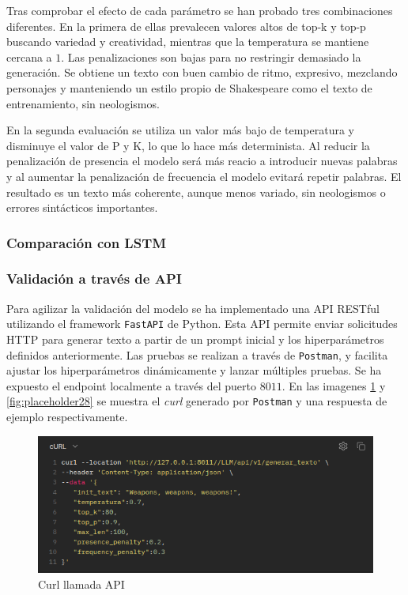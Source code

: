 \documentclass[11pt]{book}
\begin{document}
Tras comprobar el efecto de cada parámetro se han probado tres combinaciones diferentes. 
En la primera de ellas prevalecen valores altos de top-k y top-p buscando variedad y creatividad, mientras que la temperatura se mantiene cercana a $1$. Las penalizaciones son bajas para no restringir demasiado la generación. Se obtiene un texto con buen cambio de ritmo, expresivo, mezclando personajes y manteniendo un estilo propio de Shakespeare como el texto de entrenamiento, sin neologismos. 

En la segunda evaluación se utiliza un valor más bajo de temperatura y disminuye el valor de P y K, lo que lo hace más determinista. Al reducir la penalización de presencia el modelo será más reacio a introducir nuevas palabras y al aumentar la penalización de frecuencia el modelo evitará repetir palabras. El resultado es un texto más coherente, aunque menos variado, sin neologismos o errores sintácticos importantes.



\subsubsection{Comparación con LSTM}


\subsubsection{Validación a través de API}

Para agilizar la validación del modelo se ha implementado una API RESTful utilizando el framework \texttt{FastAPI} de Python. Esta API permite enviar solicitudes HTTP para generar texto a partir de un prompt inicial y los hiperparámetros definidos anteriormente. Las pruebas se realizan a través de \texttt{Postman}, y facilita ajustar los hiperparámetros dinámicamente y lanzar múltiples pruebas. Se ha expuesto el endpoint \textit{} localmente a través del puerto $8011$. En las imagenes \ref{fig:placeholder27} y \ref{fig:placeholder28} se muestra el \textit{curl} generado por \texttt{Postman} y una respuesta de ejemplo respectivamente.

\begin{figure}[h]
    \centering
    \includegraphics[width=0.5\linewidth]{img/api_curl.png}
    \caption{Curl llamada API}
    \label{fig:placeholder27}
\end{figure}
\end{document}
